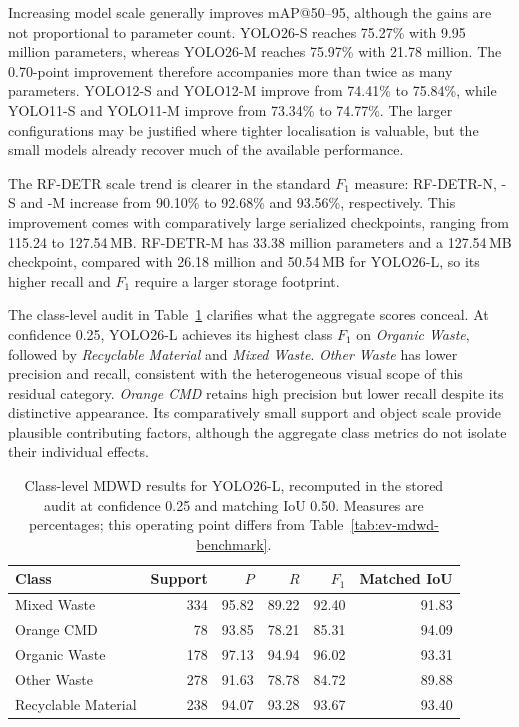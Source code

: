 Increasing model scale generally improves \gls{mAP}@50--95, although the gains are not proportional to parameter count. YOLO26-S reaches 75.27\% with 9.95 million parameters, whereas YOLO26-M reaches 75.97\% with 21.78 million. The 0.70-point improvement therefore accompanies more than twice as many parameters. YOLO12-S and YOLO12-M improve from 74.41\% to 75.84\%, while YOLO11-S and YOLO11-M improve from 73.34\% to 74.77\%. The larger configurations may be justified where tighter localisation is valuable, but the small models already recover much of the available performance.

The RF-DETR scale trend is clearer in the standard \(F_1\) measure: RF-DETR-N, -S and -M increase from 90.10\% to 92.68\% and 93.56\%, respectively. This improvement comes with comparatively large serialized checkpoints, ranging from 115.24 to 127.54\,MB. RF-DETR-M has 33.38 million parameters and a 127.54\,MB checkpoint, compared with 26.18 million and 50.54\,MB for YOLO26-L, so its higher recall and \(F_1\) require a larger storage footprint.

The class-level audit in Table~\ref{tab:ev-mdwd-classes} clarifies what the aggregate scores conceal. At confidence 0.25, YOLO26-L achieves its highest class \(F_1\) on \emph{Organic Waste}, followed by \emph{Recyclable Material} and \emph{Mixed Waste}. \emph{Other Waste} has lower precision and recall, consistent with the heterogeneous visual scope of this residual category. \emph{Orange CMD} retains high precision but lower recall despite its distinctive appearance. Its comparatively small support and object scale provide plausible contributing factors, although the aggregate class metrics do not isolate their individual effects.

\begin{table}[htbp]
\centering
\small
\caption{Class-level \gls{MDWD} results for YOLO26-L, recomputed in the stored audit at confidence 0.25 and matching \gls{IoU} 0.50. Measures are percentages; this operating point differs from Table~\ref{tab:ev-mdwd-benchmark}.}
\label{tab:ev-mdwd-classes}
\renewcommand{\arraystretch}{1.15}
\begin{tabularx}{\textwidth}{@{}>{\raggedright\arraybackslash}Xrrrrr@{}}
\toprule
Class & Support & $P$ & $R$ & $F_1$ & Matched \gls{IoU} \\
\midrule
Mixed Waste & 334 & 95.82 & 89.22 & 92.40 & 91.83 \\
Orange CMD & 78 & 93.85 & 78.21 & 85.31 & 94.09 \\
Organic Waste & 178 & 97.13 & 94.94 & 96.02 & 93.31 \\
Other Waste & 278 & 91.63 & 78.78 & 84.72 & 89.88 \\
Recyclable Material & 238 & 94.07 & 93.28 & 93.67 & 93.40 \\
\bottomrule
\end{tabularx}
\end{table}


